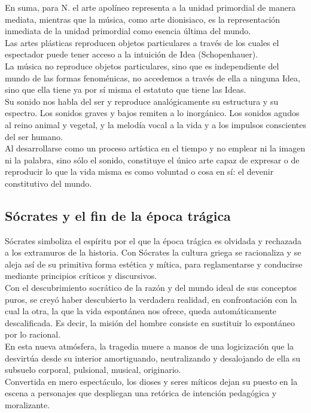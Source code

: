 \documentclass[a4paper, 10pt, twocolumn, spanish]{article}
\begin{document}
En suma, para N. el arte apolíneo representa a la unidad primordial de
manera mediata, mientras que la música, como arte dionisiaco, es la
representación inmediata de la unidad primordial como esencia última
del mundo.\\[0pt]
Las artes plásticas reproducen objetos particulares a través de los
cuales el espectador puede tener acceso a la intuición de Idea
(Schopenhauer).\\[0pt]
La música no reproduce objetos particulares, sino que es independiente
del mundo de las formas fenoménicas, no accedemos a través de ella a
ninguna Idea, sino que ella tiene ya por sí misma el estatuto que
tiene las Ideas.\\[0pt]
Su sonido nos habla del ser y reproduce analógicamente su estructura y
su espectro. Los sonidos graves y bajos remiten a lo inorgánico. Los
sonidos agudos al reino animal y vegetal, y la melodía vocal a la vida
y a los impulsos conscientes del ser humano.\\[0pt]
Al desarrollarse como un proceso artística en el tiempo y no emplear
ni la imagen ni la palabra, sino sólo el sonido, constituye el único
arte capaz de expresar o de reproducir lo que la vida misma es como
voluntad o cosa en sí: el devenir constitutivo del mundo.

\subsection{Sócrates y el fin de la época trágica}
\label{sec:orgd10fafd}
Sócrates simboliza el espíritu por el que la época trágica es olvidada
y rechazada a los extramuros de la historia. Con Sócrates la cultura
griega se racionaliza y se aleja así de su primitiva forma estética y
mítica, para reglamentarse y conducirse mediante principios críticos y
discursivos.\\[0pt]
Con el descubrimiento socrático de la razón y del mundo ideal de sus
conceptos puros, se creyó haber descubierto la verdadera realidad, en
confrontación con la cual la otra, la que la vida espontánea nos
ofrece, queda automáticamente descalificada. Es decir, la misión del
hombre consiste en sustituir lo espontáneo por lo racional.\\[0pt]

En esta nueva atmósfera, la tragedia muere a manos de una logicización
que la desvirtúa desde su interior amortiguando, neutralizando y
desalojando de ella su subsuelo corporal, pulsional, musical,
originario.\\[0pt]
Convertida en mero espectáculo, los dioses y seres míticos dejan su
puesto en la escena a personajes que despliegan una retórica de
intención pedagógica y moralizante.\\[0pt]
\end{document}
